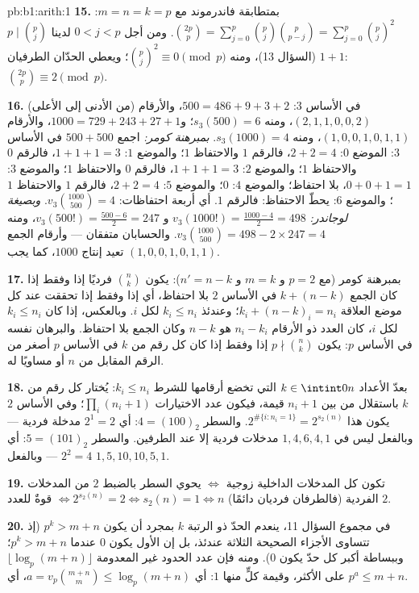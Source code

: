 \begin{solution}{pb:b1:arith:1}
\textbf{15.} بمتطابقة فاندرموند مع $m = n = k = p$: $\binom{2p}p =
\sum_{j=0}^p \binom pj\binom p{p-j} = \sum_{j=0}^p \binom pj^2$.
ومن أجل $0 < j < p$ لدينا $p \mid \binom pj$ (السؤال 13)، ومنه $\binom
pj^2 \equiv 0 \pmod p$؛ ويعطي الحدّان الطرفيان $1 + 1$:
$\binom{2p}p \equiv 2 \pmod p$.

\textbf{16.} في الأساس $3$: $500 = 486 + 9 + 3 + 2$، والأرقام (من الأدنى إلى
الأعلى) $(2, 1, 1, 0, 0, 2)$، ومنه $s_3(500) = 6$؛ و$1000 = 729 +
243 + 27 + 1$، والأرقام $(1, 0, 0, 1, 0, 1, 1)$، ومنه $s_3(1000) = 4$.
\emph{بمبرهنة كومر:} اجمع $500 + 500$ في الأساس $3$: الموضع $0$: $2 + 2 =
4$، فالرقم $1$ والاحتفاظ $1$؛ والموضع $1$: $1 + 1 + 1 = 3$، فالرقم $0$
والاحتفاظ $1$؛ والموضع $2$: $1 + 1 + 1 = 3$، فالرقم $0$ والاحتفاظ $1$؛
والموضع $3$: $0 + 0 + 1 = 1$، بلا احتفاظ؛ والموضع $4$: $0$؛
والموضع $5$: $2 + 2 = 4$، فالرقم $1$ والاحتفاظ $1$؛ والموضع $6$:
يحطّ الاحتفاظ: فالرقم $1$. أي أربعة احتفاظات: $v_3\binom{1000}{500} = 4$.
\emph{وبصيغة لوجاندر:} $v_3(1000!) = \frac{1000 - 4}2 = 498$ و
$v_3(500!) = \frac{500 - 6}2 = 247$، ومنه $v_3\binom{1000}{500} =
498 - 2\times247 = 4$. والحسابان متفقان --- وأرقام
الجمع $(1, 0, 0, 1, 0, 1, 1)$ تعيد إنتاج $1000$، كما
يجب.

\textbf{17.} بمبرهنة كومر (مع $p = 2$ و $m = k$ و $n' = n - k$):
يكون $\binom nk$ فرديًا إذا وفقط إذا كان الجمع $k + (n - k)$ في الأساس $2$ بلا
احتفاظ، أي إذا وفقط إذا تحققت عند كل موضع العلاقة $k_i + (n -
k)_i = n_i$؛ وعندئذ $k_i \leq n_i$ لكل $i$. وبالعكس،
إذا كان $k_i \leq n_i$ لكل $i$، كان العدد ذو الأرقام $n_i -
k_i$ هو $n - k$ وكان الجمع بلا احتفاظ. والبرهان نفسه في الأساس
$p$: يكون $p \nmid \binom nk$ إذا وفقط إذا كان كل رقم من $k$ في الأساس $p$
أصغر من الرقم المقابل من $n$ أو مساويًا له.

\textbf{18.} بعدّ الأعداد $k \in \intint0n$ التي تخضع أرقامها للشرط
$k_i \leq n_i$: يُختار كل رقم من $k$ باستقلال من بين
$n_i + 1$ قيمة، فيكون عدد الاختيارات $\prod_i (n_i + 1)$؛ وفي الأساس $2$
يكون هذا $2^{\#\{i : n_i = 1\}} = 2^{s_2(n)}$. والسطر $4 =
(100)_2$: أي $2^1 = 2$ مدخلة فردية --- وبالفعل ليس في $1, 4, 6, 4, 1$ مدخلات فردية
إلا عند الطرفين. والسطر $5 = (101)_2$: أي $2^2 = 4$ --- وبالفعل
$1, 5, 10, 10, 5, 1$.

\textbf{19.} تكون كل المدخلات الداخلية زوجية $\iff$ يحوي السطر بالضبط
        $2$ من المدخلات الفردية (فالطرفان فرديان دائمًا) $\iff 2^{s_2(n)} =
2 \iff s_2(n) = 1 \iff n$ قوةٌ للعدد $2$.

\textbf{20.} في مجموع السؤال 11، ينعدم الحدّ ذو الرتبة $k$ بمجرد
أن يكون $p^k > m + n$ (إذ تتساوى الأجزاء الصحيحة الثلاثة عندئذ، بل إن
الأول يكون $0$ عندما $p^k > m+n$؛ وببساطة أكبر كل حدّ يكون $0$).
ومنه فإن عدد الحدود غير المعدومة $\lfloor \log_p(m+n)\rfloor$ على الأكثر، وقيمة كلٍّ منها
$1$: أي $a = v_p\binom{m+n}m \leq \log_p(m+n)$، أي $p^a \leq
m + n$.


\end{solution}
